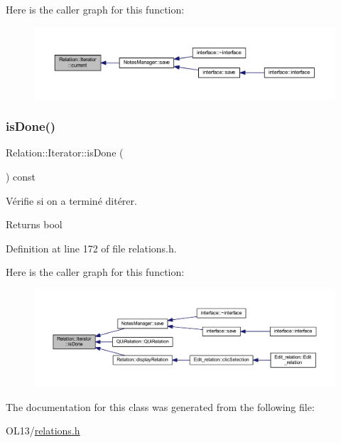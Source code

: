Here is the caller graph for this function\+:\nopagebreak
\begin{figure}[H]
\begin{center}
\leavevmode
\includegraphics[width=350pt]{class_relation_1_1_iterator_ae790f3731aad304b3930fb23fa5b9c7c_icgraph}
\end{center}
\end{figure}
\mbox{\label{class_relation_1_1_iterator_ace43327cf3c6e78a3446150a9c65c871}} 
\subsubsection{\texorpdfstring{is\+Done()}{isDone()}}
{\footnotesize\ttfamily Relation\+::\+Iterator\+::is\+Done (\begin{DoxyParamCaption}{ }\end{DoxyParamCaption}) const\hspace{0.3cm}{\ttfamily [inline]}}



Vérifie si on a terminé d\textquotesingle{}itérer. 

\begin{DoxyReturn}{Returns}
bool 
\end{DoxyReturn}


Definition at line 172 of file relations.\+h.

Here is the caller graph for this function\+:\nopagebreak
\begin{figure}[H]
\begin{center}
\leavevmode
\includegraphics[width=350pt]{class_relation_1_1_iterator_ace43327cf3c6e78a3446150a9c65c871_icgraph}
\end{center}
\end{figure}


The documentation for this class was generated from the following file\+:\begin{DoxyCompactItemize}
\item 
O\+L13/\hyperlink{relations_8h}{relations.\+h}\end{DoxyCompactItemize}
